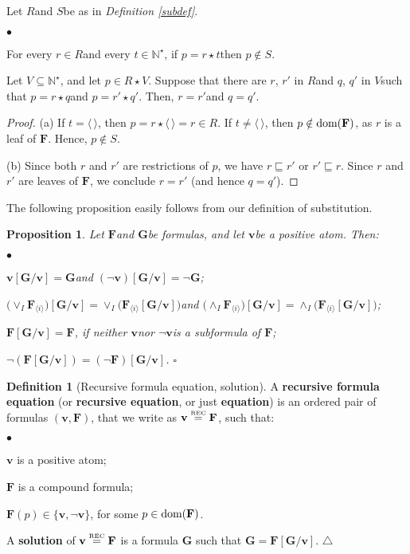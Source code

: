 \documentclass[copyright,creativecommons]{eptcs}
\newcommand{\vv}{\langle}
\newcommand{\ww}{\rangle}
\newcommand{\NN}{\mathbb{N}}
\newcommand{\eqrec}{\stackrel{\text{\tiny \textnormal{REC}}}{=}}
\newcommand{\roo}{\vv \, \ww}
\newcommand{\arpp}[2]{\textstyle\vee_{#2} \bF_{#1}}
\newcommand{\arnn}[2]{\textstyle\wedge_{#2} \bF_{#1}}
\newcommand{\bF}{\mathbf{F}}
\newcommand{\bG}{\mathbf{G}}
\newcommand{\bbv}{\mathbf{v}}
\newcommand{\dom}{\ensuremath{\textnormal{dom}}}
\newtheorem{proposition}[theorem]{Proposition}
\theoremstyle{definition}
\newtheorem{Definition}[theorem]{Definition}
\newcommand{\squishlist}{
 \begin{list}{$\bullet$}
  { \setlength{\itemsep}{0pt}
     \setlength{\parsep}{3pt}
     \setlength{\topsep}{3pt}
     \setlength{\partopsep}{0pt}
     \setlength{\leftmargin}{1em}
     \setlength{\labelwidth}{1.5em}
     \setlength{\labelsep}{0.5em} } }
\newcommand{\squishend}{
  \end{list}  }
\newcommand{\sqi}{
 \begin{list}{$\bullet$}
  { \setlength{\itemsep}{0pt}
     \setlength{\parsep}{3pt}
     \setlength{\topsep}{3pt}
     \setlength{\partopsep}{0pt}
     \setlength{\leftmargin}{1.4em}
     \setlength{\labelwidth}{1.5em}
     \setlength{\labelsep}{0.3em} } }
\newcommand{\sqe}{
  \end{list}  }
\begin{document}
\begin{lemma} \label{lemsub}
Let  \/$R$\@ and \/$S$\@ be as in \emph{Definition \ref{subdef}}.
\sqi
\item[\emph{(a)}]
For every \/$r  \in R$\@ and every  \/$ t \in \NN^\star$\@, if \/$p= r \star t$\@  then  \/$p \notin S$\@.
\item[\emph{(b)}]  Let  \/$V \subseteq \NN^\star$\@, and let   \/$p \in R \star V$\@.
Suppose that  there are  \/$r$\@,  \/$r'$ in \/$R$\@ and    \/$q$\@,   \/$q'$ in  \/$V$\@ such that  \/$ p =   r \star q$\@ and \/$p = r' \star q'$\@.
Then, \/$r = r'$\@ and \/$q = q'$\@.

\sqe
\end{lemma}
\begin{proof}
(a)
If $t = \roo$, then $p = r \star \roo  = r \in R$.
If $ t \neq \roo$, then $ p \notin \dom(\bF)$,  as $r$ is a leaf of $\bF$. Hence, $ p \notin S$.

(b)   Since   both $r$ and $r'$
are restrictions of $p$,  we have
$r \sqsubseteq r'$ or $r' \sqsubseteq r$.
 Since  $r$ and $r'$ are leaves of $\bF$,
we conclude  $r = r'$ (and  hence $q = q'$).  \end{proof}
The following proposition easily follows from our definition of substitution.

\begin{proposition} \label{subst} Let  \/$\bF$\@ and \/$\bG$\@ be  formulas, and
let \/$\bbv$\@  be a positive atom. Then:
\squishlist
\item[$\phantom{ab}$ \emph{(1)}]
$\bbv[\bG/\bbv] = \bG$\@ and  \/$(\neg\bbv)[\bG/\bbv] = \neg\bG$;
\item[$\phantom{ab}$ \emph{(2)}] $\big(\arpp{\vv i\ww}{I}\big)[\bG/\bbv] = \vee_{I} \big(\bF_{\vv i \ww}[\bG/\bbv]\big)$\@ and
\/$\big(\arnn{\vv i\ww}{I}\big)[\bG/\bbv] = \wedge_{I} \big(\bF_{\vv i \ww}[\bG/\bbv]\big)$\@;
\item[$\phantom{ab}$ \emph{(3)}] $\bF[\bG/\bbv] = \bF$\@,  if neither \/$\bbv$\@ nor \/$\neg\bbv$\@ is a subformula of  \/$\bF$\@;
\item[$\phantom{ab}$ \emph{(4)}]
$\neg(\bF[\bG/\bbv]) = (\neg\bF)[\bG/\bbv]$\@. \hfill $\square$
\squishend
\end{proposition}





\begin{Definition}[Recursive formula equation, solution] \label{receq}
A \textbf{recursive formula equation} (or  \textbf{recursive  equation}, or just \textbf{equation}) is an ordered  pair of formulas
$(\bbv, \bF)$, that we write as $ \bbv \eqrec \bF$,  such that: \squishlist
\item[$\phantom{ab}$ (R$_1$)] $\bbv$ is a positive atom;
\item[$\phantom{ab}$ (R$_2$)]  $\bF$ is  a compound formula;
\item[$\phantom{ab}$ (R$_3$)] $\bF(p) \in \{\bbv, \neg \bbv\}$,  for some $p \in \dom(\bF)$.
\squishend
 A \textbf{solution} of  $\bbv \eqrec \bF$ is a formula $\bG$ such that  $\bG = \bF[\bG/\bbv]$.
\hfill $\triangle$
\end{Definition}
\end{document}
